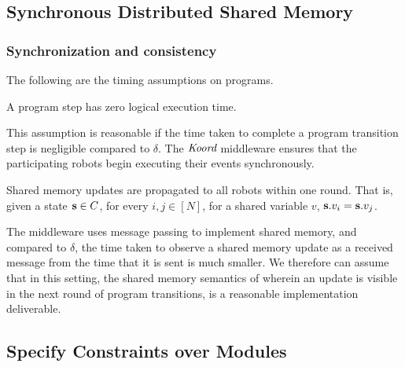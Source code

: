 \subsection{Synchronous Distributed Shared Memory}
\label{sec:memory}


%

\subsubsection{Synchronization and consistency}
The following are the timing assumptions on \lgname programs.
\begin{assumption} A program step has zero logical execution time.
\end{assumption}
This assumption is reasonable if the time taken to complete a program transition step is negligible compared to $\delta$.  The $\emph{Koord}$ middleware ensures that the participating robots begin executing their events synchronously.

\begin{assumption}
    \label{shared}
    Shared memory updates are propagated to all robots within one round. That is, given a state ${\textbf{s}}\in C$, for every  $i,j \in [N]$, for a shared variable $v$, ${\textbf{s}}.v_i = {\textbf{s}}.v_j$.
\end{assumption}
The \lgname middleware uses message passing to implement shared memory, and compared to $\delta$, the time taken to observe a shared memory update as a received message from the time that it is sent is much smaller. We therefore can assume that in this setting, the shared memory semantics of \lgname wherein an update is visible in the next round of program transitions, is a reasonable implementation deliverable.



\subsection{Specify Constraints over Modules}
\label{sec:module}
